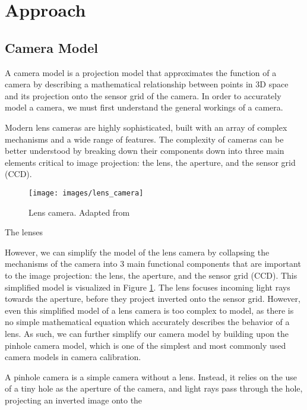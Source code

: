 \section{Approach} 

\subsection{Camera Model} \label{sec:camera_model}

A camera model is a projection model that approximates the function of a camera by describing a mathematical relationship between points in 3D space and its projection onto the sensor grid of the camera. In order to accurately model a camera, we must first understand the general workings of a camera.

Modern lens cameras are highly sophisticated, built with an array of complex mechanisms and a wide range of features. The complexity of cameras can be better understood by breaking down their components down into three main elements critical to image projection: the lens, the aperture, and the sensor grid (CCD). 

\begin{figure}[H]
    \centering
    \texttt{[image: images/lens\_camera]}
    \caption{Lens camera. Adapted from \cite{coltonPhysics1232012}} \label{fig:lens_camera}
\end{figure}

The lenses 


However, we can simplify the model of the lens camera by collapsing the mechanisms of the camera into 3 main functional components that are important to the image projection: the lens, the aperture, and the sensor grid (CCD). This simplified model is visualized in Figure \ref{fig:lens_camera}. The lens focuses incoming light rays towards the aperture, before they project inverted onto the sensor grid. However, even this simplified model of a lens camera is too complex to model, as there is no simple mathematical equation which accurately describes the behavior of a lens. As such, we can further simplify our camera model by building upon the pinhole camera model, which is one of the simplest and most commonly used camera models in camera calibration.



A pinhole camera is a simple camera without a lens. Instead, it relies on the use of a tiny hole as the aperture of the camera, and light rays pass through the hole, projecting an inverted image onto the

